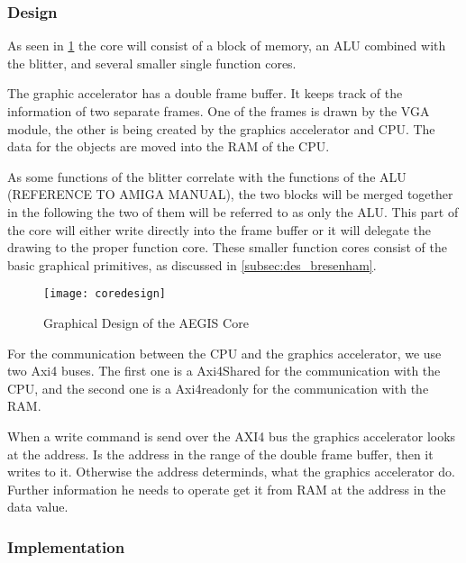 \subsubsection*{Design}
As seen in \cref{img:coredes} the core will consist of a block of memory, an ALU combined with the blitter, and several smaller single function cores.

The graphic accelerator has a double frame buffer. It keeps track of the information of two separate frames. One of the frames is drawn by the VGA module, the other is being created by the graphics accelerator and CPU. The data for the objects are moved into the RAM of the CPU.

As some functions of the blitter correlate with the functions of the ALU (REFERENCE TO AMIGA MANUAL), the two blocks will be merged together in the following the two of them will be referred to as only the ALU. This part of the core will either write directly into the frame buffer or it will delegate the drawing to the proper function core. These smaller function cores consist of the basic graphical primitives, as discussed in \cref{subsec:des_bresenham}.
\begin{figure}[H]
	\centering
	\texttt{[image: coredesign]}
	\caption{Graphical Design of the AEGIS Core }
	\label{img:coredes}
\end{figure}

For the communication between the CPU and the graphics accelerator, we use two Axi4 buses. The first one is a Axi4Shared for the communication with the CPU, and the second one is a Axi4readonly for the communication with the RAM.

When a write command is send over the AXI4 bus the graphics accelerator looks at the address. Is the address in the range of the double frame buffer, then it writes to it. Otherwise the address determinds, what the graphics accelerator do. Further information he needs to operate get it from RAM at the address in the data value. 

\subsubsection*{Implementation}